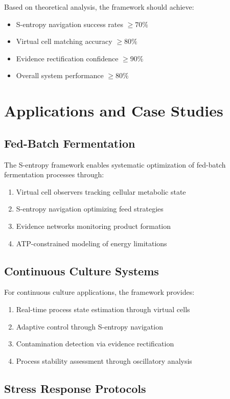 \documentclass[12pt,a4paper]{article}
\begin{document}
Based on theoretical analysis, the framework should achieve:
\begin{itemize}
\item S-entropy navigation success rates $\geq 70\%$
\item Virtual cell matching accuracy $\geq 80\%$
\item Evidence rectification confidence $\geq 90\%$
\item Overall system performance $\geq 80\%$
\end{itemize}

\section{Applications and Case Studies}

\subsection{Fed-Batch Fermentation}

The S-entropy framework enables systematic optimization of fed-batch fermentation processes through:
\begin{enumerate}
\item Virtual cell observers tracking cellular metabolic state
\item S-entropy navigation optimizing feed strategies
\item Evidence networks monitoring product formation
\item ATP-constrained modeling of energy limitations
\end{enumerate}

\subsection{Continuous Culture Systems}

For continuous culture applications, the framework provides:
\begin{enumerate}
\item Real-time process state estimation through virtual cells
\item Adaptive control through S-entropy navigation
\item Contamination detection via evidence rectification
\item Process stability assessment through oscillatory analysis
\end{enumerate}

\subsection{Stress Response Protocols}
\end{document}

